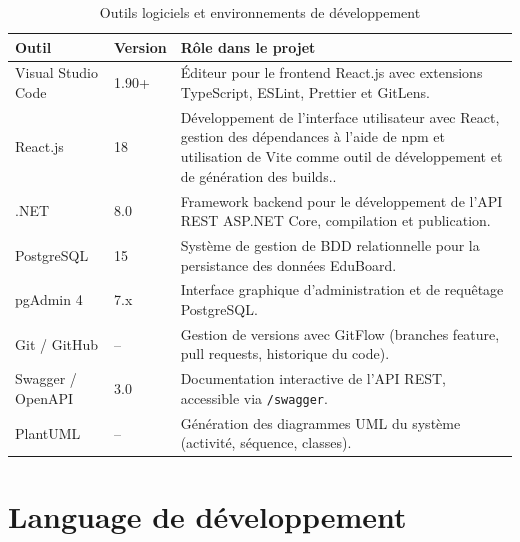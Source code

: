 \begin{table}[H]
  \centering
  \caption{Outils logiciels et environnements de développement}
  \label{tab:logiciels}
  \renewcommand{\arraystretch}{1.35}
  \begin{tabularx}{\textwidth}{|l|l|X|}
    \hline
    \textbf{Outil} & \textbf{Version} & \textbf{Rôle dans le projet} \\
    \hline
    Visual Studio Code     & 1.90+     & Éditeur pour le frontend React.js avec
                                         extensions TypeScript, ESLint, Prettier
                                         et GitLens. \\
    \hline
    React.js                & 18    & Développement de l’interface utilisateur avec React, gestion des dépendances à l’aide de npm et utilisation de Vite comme outil de développement et de génération des builds.. \\
    \hline
    .NET               & 8.0       & Framework backend pour le développement
                                         de l'\ac{API} \ac{REST} ASP.NET Core,
                                         compilation et publication. \\
    \hline
    PostgreSQL             & 15        & Système de gestion de \ac{BDD} relationnelle
                                         pour la persistance des données EduBoard. \\
    \hline
    pgAdmin 4              & 7.x       & Interface graphique d'administration et de
                                         requêtage PostgreSQL. \\
    \hline
    Git / GitHub           & --        & Gestion de versions avec GitFlow (branches
                                         feature, pull requests, historique du code). \\
    \hline
    Swagger / OpenAPI      & 3.0       & Documentation interactive de l'\ac{API}
                                         \ac{REST}, accessible via \texttt{/swagger}. \\
   
                                         
    \hline
    PlantUML               & --        & Génération des diagrammes \ac{UML} du
                                         système (activité, séquence, classes). \\
    \hline
  \end{tabularx}
\end{table}
\section{Language de développement}

